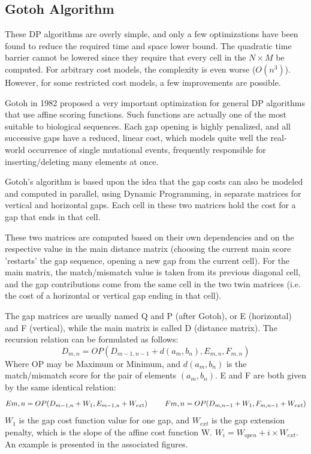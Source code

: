 \subsection{Gotoh Algorithm}
\label{Gotoh algorithm}

These \ac{DP} algorithms are overly simple, and only a few optimizations have been found to reduce the required time and space lower bound. The quadratic time barrier cannot be lowered since they require that every cell in the $N \times M$ be computed. For arbitrary cost models, the complexity is even worse ($O(n^3)$). However, for some restricted cost models, a few improvements are possible.

Gotoh in 1982 \cite{gotoh} proposed a very important optimization for general \ac{DP} algorithms that use affine scoring functions. Such functions are actually one of the most suitable to biological sequences. Each gap opening is highly penalized, and all successive gaps have a reduced, linear cost, which models quite well the real-world occurrence of single mutational events, frequently responsible for inserting/deleting many elements at once.

Gotoh's algorithm is based upon the idea that the gap costs can also be modeled and computed in parallel, using Dynamic Programming, in separate matrices for vertical and horizontal gaps. Each cell in these two matrices hold the cost for a gap that ends in that cell.

These two matrices are computed based on their own dependencies and on the respective value in the main distance matrix (choosing the current main score 'restarts' the gap sequence, opening a new gap from the current cell). For the main matrix, the match/mismatch value is taken from its previous diagonal cell, and the gap contributions come from the same cell in the two twin matrices (i.e. the cost of a horizontal or vertical gap ending in that cell).

The gap matrices are usually named Q and P (after Gotoh), or E (horizontal) and F (vertical), while the main matrix is called D (distance matrix). The recursion relation can be formulated as follows:
\hspace{2 pc}  $$D_{m,n} = OP ( D_{m-1,n-1} + d(a_m,b_n) , E_{m,n} , F_{m,n} ) $$
Where OP may be Maximum or Minimum, and $d(a_m,b_n)$ is the match/mismatch score for the pair of elements $(a_m,b_n)$. E and F are both given by the same identical relation:
\hspace{2 pc}  $$E{m,n} = OP ( D_{m-1,n} + W_1 , E_{m-1,n} + W_{ext} ) 
\hspace{2 pc}  F{m,n} = OP ( D_{m,n-1} + W_1 , F_{m,n-1} + W_{ext} ) $$
$W_1$ is the gap cost function value for one gap, and $W_{ext}$ is the gap extension penalty, which is the slope of the affine cost function W. $W_i = W_{open} + i \times W_{ext}$. An example is presented in the associated figures.

